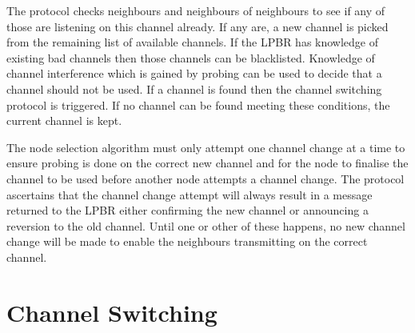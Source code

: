 The protocol checks neighbours and neighbours of neighbours to see if any of those are listening on this channel already. If any are, a new channel is picked from the remaining list of available channels. If the LPBR has knowledge of existing bad channels then those channels can be blacklisted.  Knowledge of channel interference which is gained by probing can be used to decide that a channel should not be used. If a channel is found then the channel switching protocol is triggered. If no channel can be found meeting these conditions, the current channel is kept.  

The node selection algorithm must only attempt one channel change at a time to ensure probing is done on the correct new channel and for the node to finalise the channel to be used before another node attempts a channel change.
The protocol ascertains that the channel change attempt will always result in a message returned to the LPBR either confirming the new channel or announcing a reversion to the old channel. Until one or other of these happens, no new channel change will be made to enable the neighbours transmitting on the correct channel.

\section{Channel Switching}


